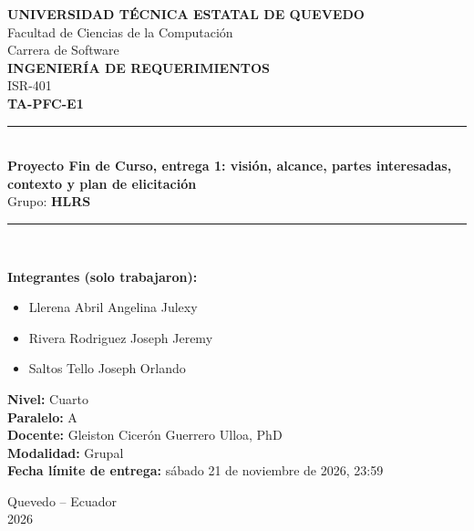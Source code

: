 \documentclass[11pt,a4paper]{article}
\begin{document}
	
	
	\begin{titlepage}
		\centering
		
		{\large \textbf{UNIVERSIDAD TÉCNICA ESTATAL DE QUEVEDO}}\\[0.3cm]
		{\large Facultad de Ciencias de la Computación}\\
		{\large Carrera de Software}\\[1.5cm]
		
		{\Large \textbf{INGENIERÍA DE REQUERIMIENTOS}}\\[0.5cm]
		{\large ISR-401}\\[1.5cm]
		
		{\LARGE \textbf{TA-PFC-E1}}\\[0.9cm]
		
		\rule{0.85\textwidth}{0.5pt}\\[0.5cm]
		
		{\large \textbf{Proyecto Fin de Curso, entrega 1: visión, alcance, partes interesadas, contexto y plan de elicitación}}\\[0.3cm]
		
		{\normalsize Grupo: \textbf{HLRS}}\\
		
		\rule{0.85\textwidth}{0.5pt}\\[1.5cm]
		
		\begin{flushleft}
			\textbf{Integrantes (solo trabajaron):}
			\begin{itemize}[noitemsep,topsep=2pt]
				\item Llerena Abril Angelina Julexy
				\item Rivera Rodriguez Joseph Jeremy
				\item Saltos Tello Joseph Orlando
			\end{itemize}
			
			\vspace{0.2cm}
			
			\textbf{Nivel:} Cuarto\\[0.4cm]
			\textbf{Paralelo:} A\\[0.4cm]
			\textbf{Docente:} Gleiston Cicerón Guerrero Ulloa, PhD\\[0.4cm]
			\textbf{Modalidad:} Grupal\\[0.4cm]
			\textbf{Fecha límite de entrega:} sábado 21 de noviembre de 2026, 23:59
		\end{flushleft}
		
		\vfill
		
		{\large Quevedo -- Ecuador}\\
		{\large 2026}
		
	\end{titlepage}
	
\end{document}
